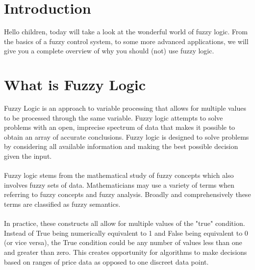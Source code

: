 \documentclass[fleqn,10pt]{SelfArx} %
\begin{document}
\flushbottom %

\maketitle

\tableofcontents %

\thispagestyle{empty} %


\section*{Introduction} %

Hello children, today will take a look at the wonderful world of fuzzy logic. From the basics of a fuzzy control system, to some more advanced applications, we will give you a complete overview of why you should (not) use fuzzy logic. \\

\section{What is Fuzzy Logic}
Fuzzy Logic is an approach to variable processing that allows for multiple values to be processed through the same variable. Fuzzy logic attempts to solve problems with an open, imprecise spectrum of data that makes it possible to obtain an array of accurate conclusions. Fuzzy logic is designed to solve problems by considering all available information and making the best possible decision given the input.\\ \\
Fuzzy logic stems from the mathematical study of fuzzy concepts which also involves fuzzy sets of data. Mathematicians may use a variety of terms when referring to fuzzy concepts and fuzzy analysis. Broadly and comprehensively these terms are classified as fuzzy semantics.\\ \\
In practice, these constructs all allow for multiple values of the "true" condition. Instead of True being numerically equivalent to 1 and False being equivalent to 0 (or vice versa), the True condition could be any number of values less than one and greater than zero. This creates opportunity for algorithms to make decisions based on ranges of price data as opposed to one discreet data point.\\
\end{document}
